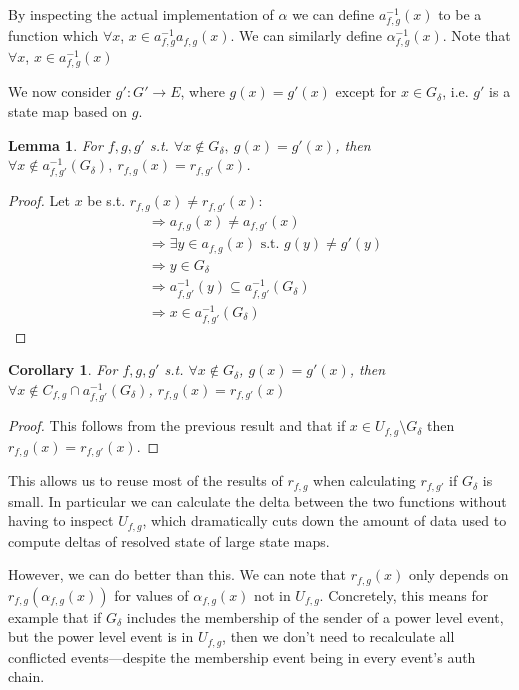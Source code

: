 \documentclass{article}
\newtheorem{lemma}[theorem]{Lemma}
\newtheorem{corollary}[theorem]{Corollary}
\begin{document}
By inspecting the actual implementation of $\alpha$ we can define $a_{f,g}^{-1}(x)$ to be a function which $\forall x$, $x \in a_{f,g}^{-1}a_{f,g}(x)$. We can similarly define $\alpha_{f,g}^{-1}(x)$. Note that $\forall x$, $x \in a_{f,g}^{-1}(x)$

We now consider $g': G' \rightarrow E$, where $g(x) = g'(x)$ except for $x \in G_\delta$, i.e. $g'$ is a state map based on $g$.

\begin{lemma}
	For $f, g, g'$ s.t. $\forall x \notin G_\delta,\ g(x) = g'(x)$, then $\forall x \notin a_{f,g'}^{-1}(G_\delta),\ r_{f,g}(x) = r_{f,g'}(x)$.
\end{lemma}

\begin{proof}
	Let $x$ be s.t. $r_{f,g}(x) \neq r_{f,g'}(x)$:
	\[
	\begin{split}
		&\Rightarrow a_{f,g}(x) \neq a_{f,g'}(x)\\
		&\Rightarrow \exists y \in a_{f,g}(x) \text{ s.t. } g(y) \neq g'(y)\\
		&\Rightarrow y \in G_\delta\\
		&\Rightarrow a_{f,g'}^{-1}(y) \subseteq a_{f,g'}^{-1}(G_\delta)\\
		&\Rightarrow x \in a_{f,g'}^{-1}(G_\delta)
	\end{split}
	\]
\end{proof}

\begin{corollary}
	For $f, g, g'$ s.t. $\forall x \notin G_\delta$, $g(x) = g'(x)$, then $\forall x \notin C_{f,g} \cap a_{f,g'}^{-1}(G_\delta)$, $r_{f,g}(x) = r_{f,g'}(x)$
\end{corollary}

\begin{proof}
	This follows from the previous result and that if $x \in U_{f,g} \setminus G_\delta$ then $r_{f,g}(x) = r_{f,g'}(x)$.
\end{proof}

This allows us to reuse most of the results of $r_{f,g}$ when calculating $r_{f,g'}$ if $G_\delta$ is small. In particular we can calculate the delta between the two functions without having to inspect $U_{f,g}$, which dramatically cuts down the amount of data used to compute deltas of resolved state of large state maps.

However, we can do better than this. We can note that $r_{f,g}(x)$ only depends on $r_{f,g}(\alpha_{f,g}(x))$ for values of $\alpha_{f,g}(x)$ not in $U_{f,g}$. Concretely, this means for example that if $G_\delta$ includes the membership of the sender of a power level event, but the power level event is in $U_{f,g}$, then we don't need to recalculate all conflicted events---despite the membership event being in every event's auth chain.
\end{document}
